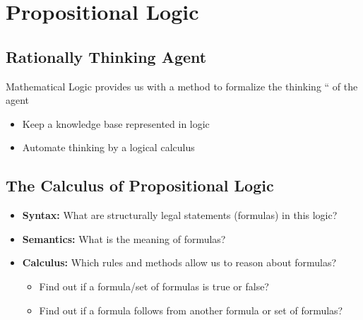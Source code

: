 \documentclass[conference, a4paper]{styles/acmsiggraph}
\begin{document}
    
    
    
    
    
    
    
    
    
\section{Propositional Logic}

    \subsection{Rationally Thinking Agent}
        Mathematical Logic provides us with a method to formalize the thinking “ of the agent
        \begin{itemize}
            \item Keep a knowledge base represented in logic
            \item Automate thinking by a logical calculus
        \end{itemize}
    
    
    \subsection{The Calculus of Propositional Logic}
        \begin{itemize}
            \item \textbf{Syntax:} What are structurally legal statements (formulas) in this logic?
            \item \textbf{Semantics:} What is the meaning of formulas?
            \item \textbf{Calculus:} Which rules and methods allow us to reason about formulas?
                \begin{itemize}
                    \item Find out if a formula/set of formulas is true or false?
                    \item Find out if a formula follows from another formula or set of formulas?
                \end{itemize}
        \end{itemize}
    
    
\end{document}
